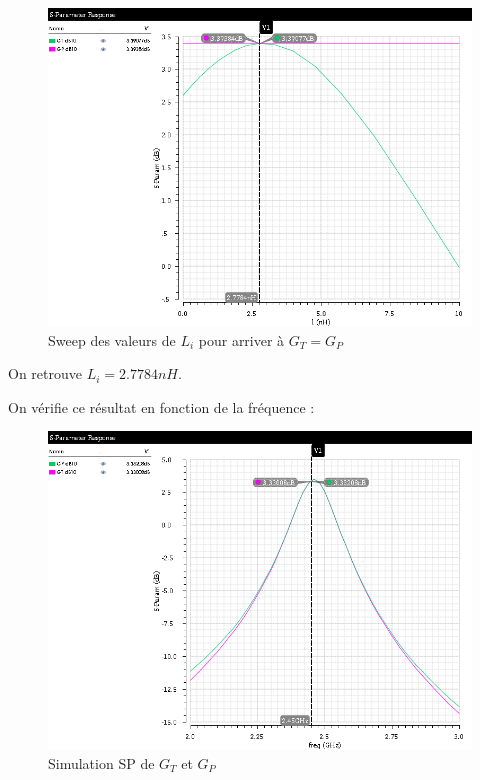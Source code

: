 \documentclass[a4paper]{article}
\begin{document}
\begin{figure}[!htb]
\begin{center}
  \includegraphics[scale=0.35]{Q5-L_i-sweep.png}
  \caption{Sweep des valeurs de $L_i$ pour arriver \`a $G_T = G_P$}
  \label{sim-li-sweep}
\end{center}
\end{figure}

On retrouve $L_i = 2.7784 nH$.\\

\clearpage

On v\'erifie ce r\'esultat en fonction de la fr\'equence :

\begin{figure}[!htb]
\begin{center}
  \includegraphics[scale=0.45]{Q5-GT-GP-db20.png}
  \caption{Simulation SP de $G_T$ et $G_P$  }
  \label{sim-li-gt-gp}
\end{center}
\end{figure}
\end{document}
